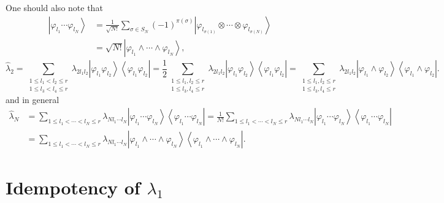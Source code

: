 \documentclass[aps,preprint]{revtex4}%
\begin{document}
One should also note that
\begin{align*}
\left\vert \varphi_{l_{1}}\cdots\varphi_{l_{N}}\right\rangle  &  =\frac
{1}{\sqrt{N!}}\sum_{\sigma\in S_{N}}\left(  -1\right)  ^{\pi\left(
\sigma\right)  }\left\vert \varphi_{l_{\sigma\left(  1\right)  }}\otimes
\cdots\otimes\varphi_{l_{\sigma\left(  N\right)  }}\right\rangle \\
&  =\sqrt{N!}\left\vert \varphi_{l_{1}}\wedge\cdots\wedge\varphi_{l_{N}%
}\right\rangle ,
\end{align*}%
\[
\hat{\lambda}_{2}=\sum_{\substack{1\leq l_{1}<l_{2}\leq r\\1\leq l_{3}%
<l_{4}\leq r}}\lambda_{2l_{1}l_{2}}\left\vert \varphi_{l_{1}}\varphi_{l_{2}%
}\right\rangle \left\langle \varphi_{l_{1}}\varphi_{l_{2}}\right\vert
=\frac{1}{2}\sum_{\substack{1\leq l_{1},l_{2}\leq r\\1\leq l_{3},l_{4}\leq
r}}\lambda_{2l_{1}l_{2}}\left\vert \varphi_{l_{1}}\varphi_{l_{2}}\right\rangle
\left\langle \varphi_{l_{1}}\varphi_{l_{2}}\right\vert =\sum_{\substack{1\leq
l_{1},l_{2}\leq r\\1\leq l_{3},l_{4}\leq r}}\lambda_{2l_{1}l_{2}}\left\vert
\varphi_{l_{1}}\wedge\varphi_{l_{2}}\right\rangle \left\langle \varphi_{l_{1}%
}\wedge\varphi_{l_{2}}\right\vert .
\]
and in general%
\begin{align*}
\hat{\lambda}_{N}  &  =\sum_{1\leq l_{1}<\cdots<l_{N}\leq r}\lambda
_{Nl_{1}\cdots l_{N}}\left\vert \varphi_{l_{1}}\cdots\varphi_{l_{N}%
}\right\rangle \left\langle \varphi_{l_{1}}\cdots\varphi_{l_{N}}\right\vert
=\frac{1}{N!}\sum_{1\leq l_{1}<\cdots<l_{N}\leq r}\lambda_{Nl_{1}\cdots l_{N}%
}\left\vert \varphi_{l_{1}}\cdots\varphi_{l_{N}}\right\rangle \left\langle
\varphi_{l_{1}}\cdots\varphi_{l_{N}}\right\vert \\
&  =\sum_{1\leq l_{1}<\cdots<l_{N}\leq r}\lambda_{Nl_{1}\cdots l_{N}%
}\left\vert \varphi_{l_{1}}\wedge\cdots\wedge\varphi_{l_{N}}\right\rangle
\left\langle \varphi_{l_{1}}\wedge\cdots\wedge\varphi_{l_{N}}\right\vert .
\end{align*}


\section{Idempotency of $\lambda_{1}$}
\end{document}
